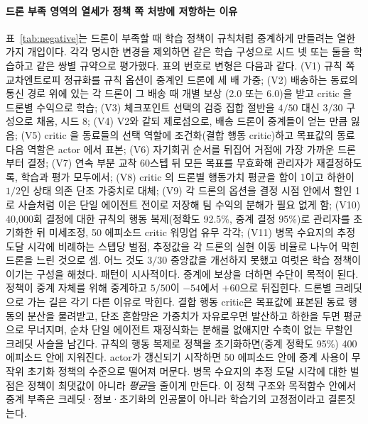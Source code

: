 \documentclass[final,5p,times,twocolumn]{elsarticle}
\begin{document}
\paragraph{드론 부족 영역의 열세가 정책 쪽 처방에 저항하는 이유}
\label{sec:negative}
표~\ref{tab:negative}는 드론이 부족할 때 학습 정책이 규칙처럼 중계하게 만들려는 열한 가지
개입이다. 각각 명시한 변경을 제외하면 같은 학습 구성으로 시드 넷 또는 둘을 학습하고 같은 쌍별 규약으로
평가했다. 표의 번호로 변형은 다음과 같다. (V1) 규칙 쪽 교차엔트로피 정규화를 규칙 옵션이
중계인 드론에 세 배 가중; (V2) 배송하는 동료의 통신 경로 위에 있는 각 드론이 그 배송 때 개별 보상
(2.0 또는 6.0)을 받고 critic 을 드론별 수익으로 학습; (V3) 체크포인트 선택의 검증 집합 절반을
$4/50$ 대신 $3/30$ 구성으로 채움, 시드 8; (V4) V2와 같되 제로섬으로, 배송 드론이 중계들이 얻는
만큼 잃음; (V5) critic 을 동료들의 선택 역할에 조건화(결합 행동 critic)하고 목표값의 동료 다음
역할은 actor 에서 표본; (V6) 자기회귀 순서를 뒤집어 거점에 가장 가까운 드론부터 결정; (V7) 연속
부분 교착 60스텝 뒤 모든 목표를 무효화해 관리자가 재결정하도록, 학습과 평가 모두에서; (V8) critic 의
드론별 행동가치 평균을 합이 1이고 하한이 $1/2$인 상태 의존 단조 가중치로 대체; (V9) 각 드론의
옵션을 결정 시점 안에서 할인 1로 사슬처럼 이은 단일 에이전트 전이로 저장해 팀 수익의 분해가 필요
없게 함; (V10) 40{,}000회 결정에 대한 규칙의 행동 복제(정확도 92.5\%, 중계 결정 95\%)로
관리자를 초기화한 뒤 미세조정, 50 에피소드 critic 워밍업 유무 각각; (V11) 병목 수요지의 추정
도달 시각에 비례하는 스텝당 벌점, 추정값을 각 드론의 실현 이동 비율로 나누어 막힌 드론을 느린
것으로 셈. 어느 것도 $3/30$ 중앙값을 개선하지 못했고 여럿은 학습 정책이 이기는 구성을 해쳤다. 패턴이 시사적이다. 중계에
보상을 더하면 수단이 목적이 된다. 정책이 중계 자체를 위해 중계하고 $5/50$이 $-54$에서 $+60$으로
뒤집힌다. 드론별 크레딧으로 가는 길은 각기 다른 이유로 막힌다. 결합 행동 critic은 목표값에 표본된
동료 행동의 분산을 물려받고, 단조 혼합망은 가중치가 자유로우면 발산하고 하한을 두면 평균으로
무너지며, 순차 단일 에이전트 재정식화는 분해를 없애지만 수축이 없는 무할인 크레딧 사슬을 남긴다.
규칙의 행동 복제로 정책을 초기화하면(중계 정확도 95\%) 400 에피소드 안에 지워진다. actor가
갱신되기 시작하면 50 에피소드 안에 중계 사용이 무작위 초기화 정책의 수준으로 떨어져 머문다. 병목
수요지의 추정 도달 시각에 대한 벌점은 정책이 최댓값이 아니라 \emph{평균}을 줄이게 만든다. 이
정책 구조와 목적함수 안에서 중계 부족은 크레딧·정보·초기화의 인공물이 아니라 학습기의
고정점이라고 결론짓는다.

\begin{table}[t]
\centering
\caption{드론 부족 영역의 열세를 제거하지 못한 개입들, 본문의 번호와 같음. 셀은 규칙 대비 쌍별
중앙 차이의 시드 간 범위(양수: 학습이 느림)와, 괄호 안에 차이가 $p<0.05$(윌콕슨 부호순위)로 유의한
시드 수 / 학습한 시드 수다. 기준 행은 튜닝된 규칙에 대한 제안 정책(표~\ref{tab:paired})이고,
변형 행들은 튜닝 전 복구 파라미터($k_{\mathrm{stall}}=60$, $h_{\mathrm{hold}}=40$)의 규칙에
대해 평가되었으며 그 규칙에 대한 제안 정책은 $+40$, $-54$, $+0$이었으므로, 기준 행과 변형 행
사이의 수십 스텝 차이는 의미가 없다.}
\label{tab:negative}
\scriptsize
\setlength{\tabcolsep}{3pt}

\end{table}
\end{document}
